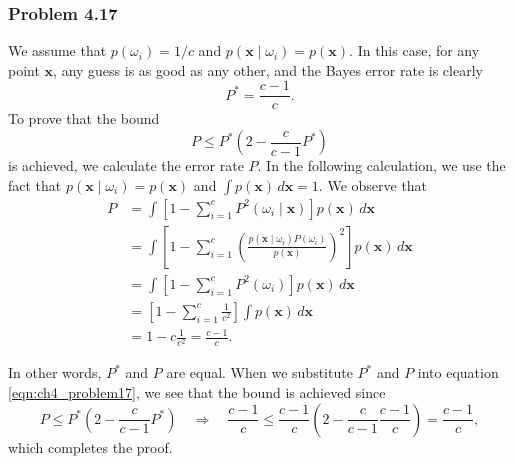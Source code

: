 \documentclass[12pt, a4paper]{article}
\newcommand{\vect}[1]{\bm{#1}}
\begin{document}
\begin{easylist}[enumerate]
\end{easylist}


\subsubsection*{Problem 4.17}
We assume that $p(\omega_i) = 1/ c$ and $p(\vect{x} \mid \omega_i) = p(\vect{x})$.
In this case, for any point $\vect{x}$, any guess is as good as any other, and the Bayes error rate is clearly
\begin{equation*}
	P^* = \frac{c-1}{c}.
\end{equation*}
To prove that the bound
\begin{equation}
\label{eqn:ch4_problem17}
	P \leq P^* \left( 2 - \frac{c}{c - 1}P^* \right)
\end{equation}
is achieved, we calculate the error rate $P$.
In the following calculation, we use the fact that $p(\vect{x} \mid \omega_i) = p(\vect{x})$ and $\int p( \vect{x}) \, d\vect{x} = 1$.
We observe that
\begin{align*}
	P &= \int \left[ 1 - \sum_{i=1}^{c} P^2 \left( \omega_i \mid \vect{x} \right) \right] p( \vect{x}) \, d\vect{x} \\
	&= \int \left[ 1 - \sum_{i=1}^{c}  \left( \frac{p(\vect{x} \mid \omega_i) P( \omega_i) }{p(\vect{x})} \right)^2 \right] p( \vect{x}) \, d\vect{x} \\
	&= \int \left[ 1 - \sum_{i=1}^{c} P^2( \omega_i) \right] p( \vect{x}) \, d\vect{x} \\
	&= \left[ 1 - \sum_{i=1}^{c} \frac{1}{c^2} \right]  \int  p( \vect{x}) \, d\vect{x} \\
	&= 1 - c \frac{1}{c^2} = \frac{c-1}{c}.
\end{align*}

In other words, $P^*$ and $P$ are equal. 
When we substitute $P^*$ and $P$ into equation \eqref{eqn:ch4_problem17}, we see that the bound is achieved since 
\begin{equation*}
	P \leq P^* \left( 2 - \frac{c}{c - 1}P^* \right) 
	\quad  \Rightarrow \quad
	\frac{c-1}{c} \leq \frac{c-1}{c} \left( 2 - \frac{c}{c-1} \frac{c-1}{c}  \right) = \frac{c-1}{c},
\end{equation*}
which completes the proof.
\end{document}

